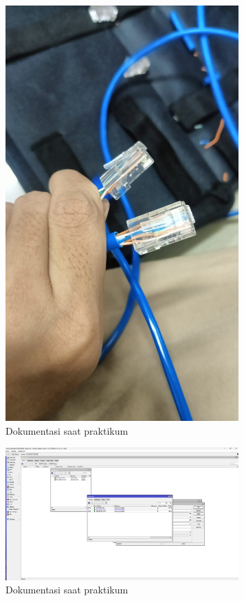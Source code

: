\begin{figure}
    \centering
    \includegraphics[width=0.8\textwidth]{P1/img/jk1 (5).jpg}
    \caption{Dokumentasi saat praktikum}
    \label{fig:dokumentasi_praktikum_5}
\end{figure}
\begin{figure}
    \centering
    \includegraphics[width=0.8\textwidth]{P1/img/routing.png}
    \caption{Dokumentasi saat praktikum}
    \label{fig:dokumentasi_praktikum_6}
\end{figure}
